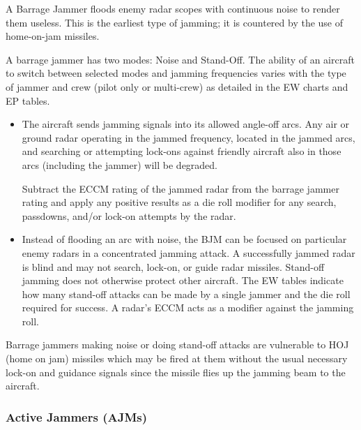 A Barrage Jammer floods enemy radar scopes with continuous noise to render them useless. This is the earliest type of jamming; it is countered by the use of home-on-jam missiles.

A barrage jammer has two modes: Noise and Stand-Off. The ability of an aircraft to switch between selected modes and jamming frequencies varies with the type of jammer and crew (pilot only or multi-crew) as detailed in the EW charts and EP tables. 

\begin{itemize}

    \item {} The aircraft sends jamming signals into its allowed angle-off arcs. Any air or ground radar operating in the jammed frequency, located in the jammed arcs, and searching or attempting lock-ons against friendly aircraft also in those arcs (including the jammer) will be degraded.

    Subtract the ECCM rating of the jammed radar from the barrage jammer rating and apply any positive results as a die roll modifier for any search, passdowns, and/or lock-on attempts by the radar.

    \item {} Instead of flooding an arc with noise, the BJM can be focused on particular enemy radars in a concentrated jamming attack. A successfully jammed radar is blind and may not search, lock-on, or guide radar missiles. Stand-off jamming does not otherwise protect other aircraft. The EW tables indicate how many stand-off attacks can be made by a single jammer and the die roll required for success. A radar's ECCM acts as a modifier against the jamming roll.
    
\end{itemize}


Barrage jammers making noise or doing stand-off attacks are vulnerable to HOJ (home on jam) missiles which may be fired at them without the usual necessary lock-on and guidance signals since the missile flies up the jamming beam to the aircraft.

\subsubsection{Active Jammers (AJMs)}

